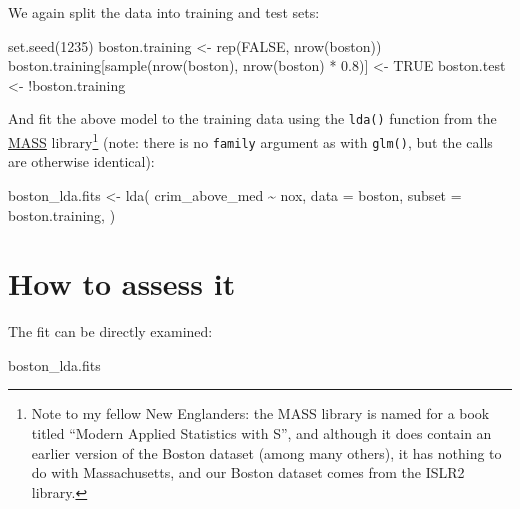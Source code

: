 \documentclass[
]{book}
\newenvironment{Shaded}{\begin{snugshade}}{\end{snugshade}}
\newcommand{\AttributeTok}[1]{\textcolor[rgb]{0.77,0.63,0.00}{#1}}
\newcommand{\ConstantTok}[1]{\textcolor[rgb]{0.00,0.00,0.00}{#1}}
\newcommand{\DecValTok}[1]{\textcolor[rgb]{0.00,0.00,0.81}{#1}}
\newcommand{\FloatTok}[1]{\textcolor[rgb]{0.00,0.00,0.81}{#1}}
\newcommand{\FunctionTok}[1]{\textcolor[rgb]{0.00,0.00,0.00}{#1}}
\newcommand{\NormalTok}[1]{#1}
\newcommand{\OtherTok}[1]{\textcolor[rgb]{0.56,0.35,0.01}{#1}}
\newcommand{\SpecialCharTok}[1]{\textcolor[rgb]{0.00,0.00,0.00}{#1}}
\begin{document}
We again split the data into training and test sets:

\begin{Shaded}
\begin{Highlighting}[]
\FunctionTok{set.seed}\NormalTok{(}\DecValTok{1235}\NormalTok{)}
\NormalTok{boston.training }\OtherTok{\textless{}{-}} \FunctionTok{rep}\NormalTok{(}\ConstantTok{FALSE}\NormalTok{, }\FunctionTok{nrow}\NormalTok{(boston))}
\NormalTok{boston.training[}\FunctionTok{sample}\NormalTok{(}\FunctionTok{nrow}\NormalTok{(boston), }\FunctionTok{nrow}\NormalTok{(boston) }\SpecialCharTok{*} \FloatTok{0.8}\NormalTok{)] }\OtherTok{\textless{}{-}} \ConstantTok{TRUE}
\NormalTok{boston.test }\OtherTok{\textless{}{-}} \SpecialCharTok{!}\NormalTok{boston.training}
\end{Highlighting}
\end{Shaded}

And fit the above model to the training data using the \texttt{lda()} function from the \href{https://cran.r-project.org/web/packages/MASS/index.html}{MASS} library\footnote{Note to my fellow New Englanders: the MASS library is named for a book titled ``Modern Applied Statistics with S'', and although it does contain an earlier version of the Boston dataset (among many others), it has nothing to do with Massachusetts, and our Boston dataset comes from the ISLR2 library.} (note: there is no \texttt{family} argument as with \texttt{glm()}, but the calls are otherwise identical):

\begin{Shaded}
\begin{Highlighting}[]
\NormalTok{boston\_lda.fits }\OtherTok{\textless{}{-}}
  \FunctionTok{lda}\NormalTok{(}
\NormalTok{    crim\_above\_med }\SpecialCharTok{\textasciitilde{}}\NormalTok{ nox,}
    \AttributeTok{data =}\NormalTok{ boston,}
    \AttributeTok{subset =}\NormalTok{ boston.training,}
\NormalTok{  )}
\end{Highlighting}
\end{Shaded}

\hypertarget{how-to-assess-it-3}{%
\section{How to assess it}\label{how-to-assess-it-3}}

The fit can be directly examined:

\begin{Shaded}
\begin{Highlighting}[]
\NormalTok{boston\_lda.fits}
\end{Highlighting}
\end{Shaded}
\end{document}
